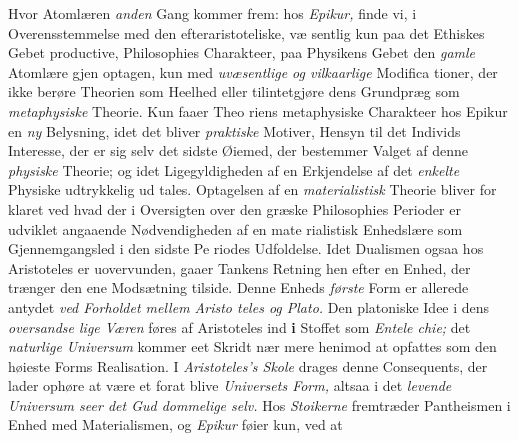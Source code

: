 Hvor Atomlæren \emph{anden} Gang kommer frem: hos \emph{Epikur,}
finde vi, i Overensstemmelse med den efteraristoteliske, væ\-%
sentlig kun paa det Ethiskes Gebet productive, Philosophies
Charakteer, paa Physikens Gebet den \emph{gamle} Atomlære gjen\-%
optagen, kun med \emph{uvæsentlige og vilkaarlige} Modifica\-%
tioner, der ikke berøre Theorien som Heelhed eller tilintetgjøre
dens Grundpræg som \emph{metaphysiske} Theorie. Kun faaer Theo\-%
riens metaphysiske Charakteer hos Epikur en \emph{ny} Belysning,
idet det bliver \emph{praktiske} Motiver, Hensyn til det Individs
Interesse, der er sig selv det sidste Øiemed, der bestemmer
Valget af denne \emph{physiske} Theorie; og idet Ligegyldigheden
af en Erkjendelse af det \emph{enkelte} Physiske udtrykkelig ud\-%
tales. Optagelsen af en \emph{materialistisk} Theorie bliver for\-%
klaret ved hvad der i Oversigten over den græske Philosophies
Perioder er udviklet angaaende Nødvendigheden af en mate\-%
rialistisk Enhedslære som Gjennemgangsled i den sidste Pe\-%
riodes Udfoldelse. Idet Dualismen ogsaa hos Aristoteles er
uovervunden, gaaer Tankens Retning hen efter en Enhed, der
trænger den ene Modsætning tilside. Denne Enheds \emph{første}
Form er allerede antydet \emph{ved Forholdet mellem Aristo\-%
teles og Plato.} Den platoniske Idee i dens \emph{oversandse\-%
lige Væren} føres af Aristoteles ind \textbf{i} Stoffet som \emph{Entele\-%
chie;} det \emph{naturlige Universum} kommer eet Skridt nær\-%
mere henimod at opfattes som den høieste Forms Realisation.
I \emph{Aristoteles's Skole} drages denne Consequents, der lader
 ophøre at være et  forat blive \emph{Universets
Form,} altsaa i det \emph{levende Universum seer det Gud\-%
dommelige selv.} Hos \emph{Stoikerne} fremtræder Pantheismen
i Enhed med Materialismen, og \emph{Epikur} føier kun, ved at
